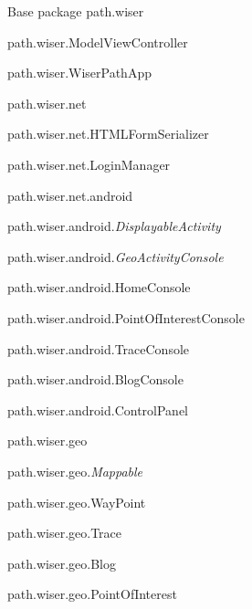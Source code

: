 \documentclass[12pt,letterpaper,titlepage]{article}
\begin{document}
Base package path.wiser
\begin{description}
\item {path.wiser.ModelViewController}
\item {path.wiser.WiserPathApp}
\item {path.wiser.net}

\item {path.wiser.net.HTMLFormSerializer}
\item {path.wiser.net.LoginManager}

\item {path.wiser.net.android}

\item {path.wiser.android.\textit{DisplayableActivity}}
\item {path.wiser.android.\textit{GeoActivityConsole}}
\item {path.wiser.android.HomeConsole}
\item {path.wiser.android.PointOfInterestConsole}
\item {path.wiser.android.TraceConsole}
\item {path.wiser.android.BlogConsole}
\item {path.wiser.android.ControlPanel}
\item {path.wiser.geo}

\item {path.wiser.geo.\textit{Mappable}}
\item {path.wiser.geo.WayPoint}
\item {path.wiser.geo.Trace}
\item {path.wiser.geo.Blog}
\item {path.wiser.geo.PointOfInterest}

\end{description}
\end{document}
